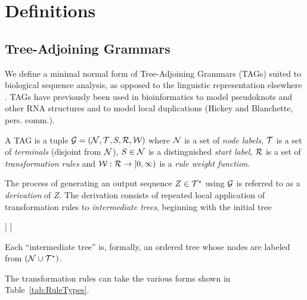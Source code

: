 \documentclass[10pt]{article}
\newcommand{\tabnum}[1]{\ref{tab:#1}}
\newcommand{\tabref}[1]{Table~\tabnum{#1}}
\begin{document}
\section{Definitions}

\subsection{Tree-Adjoining Grammars}

We define a minimal normal form of Tree-Adjoining Grammars (TAGs)
suited to biological sequence analysis,
as opposed to the linguistic representation elsewhere \cite{JoshiSchabes97}.
TAGs have previously been used in bioinformatics
to model pseudoknots and other RNA structures \cite{MatsuiEtAl2005,ChiangJoshiSearls2006}
and to model local duplications (Hickey and Blanchette, pers. comm.).

\newcommand\grammar{{\cal G}}
\newcommand\nodelabels{{\cal N}}
\newcommand\terminals{{\cal T}}
\newcommand\startsymbol{S}
\newcommand\rules{{\cal R}}
\newcommand\weight{{\cal W}}

A TAG is a tuple $\grammar=(\nodelabels,\terminals,\startsymbol,\rules,\weight)$ where
$\nodelabels$ is a set of {\em node labels},
$\terminals$ is a set of {\em terminals} (disjoint from $\nodelabels$),
$\startsymbol \in \nodelabels$ is a distinguished {\em start label},
$\rules$ is a set of {\em transformation rules}
and $\weight:\rules \to [0,\infty)$ is a {\em rule weight function}.

\newcommand\outseq{Z}
\newcommand\outsubseq[2]{\outseq[#1 \ldots #2]}

The process of generating an output sequence $\outseq \in \terminals^\ast$ using $\grammar$
is referred to as a {\em derivation} of $\outseq$.
The derivation consists of repeated local application of transformation rules to {\em intermediate trees}, beginning with the initial tree

\Tree[ .$\epsilon$ [ .$\startsymbol$ [ .$\epsilon$ ] ] ]

Each ``intermediate tree'' is, formally, an ordered tree whose nodes are labeled from
$(\nodelabels \cup \terminals^\ast)$.

The transformation rules can take the various forms shown in \tabref{RuleTypes}.
\end{document}

